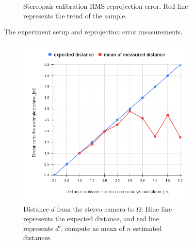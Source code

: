 \begin{figure}[ht]
\begin{subfigure}[ht]{0.7\textwidth}
    \caption[Stereopair calibration RMS reprojection error.]{Stereopair calibration RMS reprojection error. Red line represents the trend of the sample.}
    \label{fig:exp_1_repro}
  \end{subfigure}
  \caption{The experiment setup and reprojection error measurements.}
  \label{fig:exp_1_exp0}
\end{figure}

\begin{figure}[ht]
  \begin{subfigure}[ht]{0.49\textwidth}
    \centering
    \includegraphics[width=\textwidth]{graphics/experiment_1_chart_planedist.png}
    \caption[Distance to the estimated plane]{Distance $d$ from the stereo camera to $\Omega$.
    Blue line represents the expected distance, and red line represents $d'$, compute as mean of $n$ estimated distances.}
    \label{fig:exp_1_chart_dists}
  \end{subfigure}
  \hfill
  \begin{subfigure}[ht]{0.49\textwidth}
    \centering

\end{subfigure}
\end{figure}
